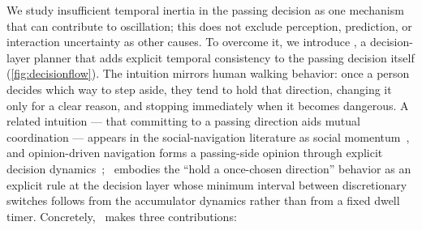 We study insufficient temporal inertia in the passing decision as one mechanism that can contribute to oscillation; this does not exclude perception, prediction, or interaction uncertainty as other causes. To overcome it, we introduce \emph{\sname}, a decision-layer planner that adds explicit temporal consistency to the passing decision itself (\cref{fig:decisionflow}). The intuition mirrors human walking behavior: once a person decides which way to step aside, they tend to hold that direction, changing it only for a clear reason, and stopping immediately when it becomes dangerous. A related intuition --- that committing to a passing direction aids mutual coordination --- appears in the social-navigation literature as social momentum~\citep{mavrogiannis2022momentum}, and opinion-driven navigation forms a passing-side opinion through explicit decision dynamics~\citep{cathcart2023opinion}; \sname\ embodies the ``hold a once-chosen direction'' behavior as an explicit rule at the decision layer whose minimum interval between discretionary switches follows from the accumulator dynamics rather than from a fixed dwell timer. Concretely, \sname\ makes three contributions:
